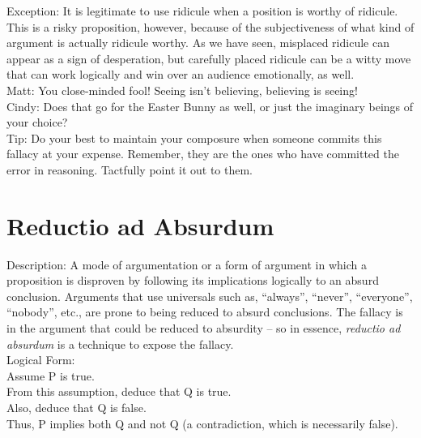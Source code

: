 \documentclass[a4paper,12pt,single,pdftex]{scrartcl}
\begin{document}
{      
        Exception: It is legitimate to use ridicule when a position is worthy of ridicule.  This is a risky proposition, however, because of the subjectiveness of what kind of argument is actually ridicule worthy.  As we have seen, misplaced ridicule can appear as a sign of desperation, but carefully placed ridicule can be a witty move that can work logically and win over an audience emotionally, as well.
      \\

      
        Matt: You close-minded fool!  Seeing isn’t believing, believing is seeing!
      \\

      
        Cindy: Does that go for the Easter Bunny as well, or just the imaginary beings of your choice?
      \\

      
        Tip: Do your best to maintain your composure when someone commits this fallacy at your expense.  Remember, they are the ones who have committed the error in reasoning.  Tactfully point it out to them.
      \\

    
    \section{
      Reductio ad Absurdum
    }
  
    
      
        Description: A mode of argumentation or a form of argument in which a proposition is disproven by following its implications logically to an absurd conclusion.  Arguments that use universals such as, “always”, “never”, “everyone”, “nobody”, etc., are prone to being reduced to absurd conclusions.  The fallacy is in the argument that could be reduced to absurdity -- so in essence, {\it reductio ad absurdum} is a technique to expose the fallacy.
      \\

      
        Logical Form:
      \\

      
        Assume P is true.
      \\

      
        From this assumption, deduce that Q is true.
      \\

      
        Also, deduce that Q is false.
      \\

      
        Thus, P implies both Q and not Q (a contradiction, which is necessarily false).
      \\

}
\end{document}
